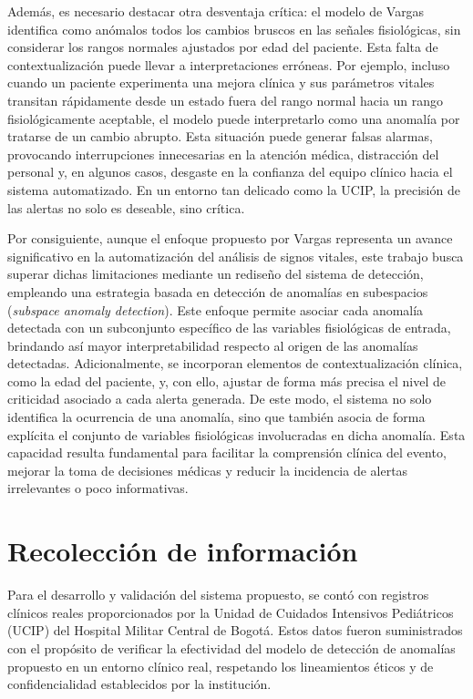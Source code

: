 Además, es necesario destacar otra desventaja crítica: el modelo de Vargas identifica como anómalos todos los cambios bruscos en las señales fisiológicas, sin considerar los rangos normales ajustados por edad del paciente. Esta falta de contextualización puede llevar a interpretaciones erróneas. Por ejemplo, incluso cuando un paciente experimenta una mejora clínica y sus parámetros vitales transitan rápidamente desde un estado fuera del rango normal hacia un rango fisiológicamente aceptable, el modelo puede interpretarlo como una anomalía por tratarse de un cambio abrupto. Esta situación puede generar falsas alarmas, provocando interrupciones innecesarias en la atención médica, distracción del personal y, en algunos casos, desgaste en la confianza del equipo clínico hacia el sistema automatizado. En un entorno tan delicado como la UCIP, la precisión de las alertas no solo es deseable, sino crítica.

Por consiguiente, aunque el enfoque propuesto por Vargas representa un avance significativo en la automatización del análisis de signos vitales, este trabajo busca superar dichas limitaciones mediante un rediseño del sistema de detección, empleando una estrategia basada en detección de anomalías en subespacios (\textit{subspace anomaly detection}). Este enfoque permite asociar cada anomalía detectada con un subconjunto específico de las variables fisiológicas de entrada, brindando así mayor interpretabilidad respecto al origen de las anomalías detectadas. Adicionalmente, se incorporan elementos de contextualización clínica, como la edad del paciente, y, con ello, ajustar de forma más precisa el nivel de criticidad asociado a cada alerta generada. De este modo, el sistema no solo identifica la ocurrencia de una anomalía, sino que también asocia de forma explícita el conjunto de variables fisiológicas involucradas en dicha anomalía. Esta capacidad resulta fundamental para facilitar la comprensión clínica del evento, mejorar la toma de decisiones médicas y reducir la incidencia de alertas irrelevantes o poco informativas.


\section{Recolección de información}


Para el desarrollo y validación del sistema propuesto, se contó con registros clínicos reales proporcionados por la Unidad de Cuidados Intensivos Pediátricos (UCIP) del Hospital Militar Central de Bogotá. Estos datos fueron suministrados con el propósito de verificar la efectividad del modelo de detección de anomalías propuesto en un entorno clínico real, respetando los lineamientos éticos y de confidencialidad establecidos por la institución.

